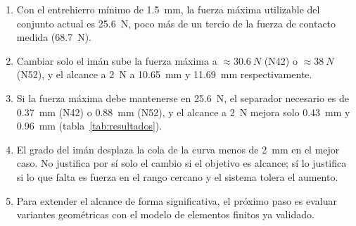 \documentclass[11pt,a4paper]{article}
\begin{document}
\begin{enumerate}
  \item Con el entrehierro mínimo de \SI{1,5}{mm}, la fuerza máxima utilizable del conjunto
  actual es \SI{25,6}{N}, poco más de un tercio de la fuerza de contacto medida
  (\SI{68,7}{N}).
  \item Cambiar solo el imán sube la fuerza máxima a $\approx\SI{30,6}{N}$ (N42) o
  $\approx\SI{38}{N}$ (N52), y el alcance a \SI{2}{N} a \SI{10,65}{mm} y \SI{11,69}{mm}
  respectivamente.
  \item Si la fuerza máxima debe mantenerse en \SI{25,6}{N}, el separador necesario es de
  \SI{0,37}{mm} (N42) o \SI{0,88}{mm} (N52), y el alcance a \SI{2}{N} mejora solo
  \SI{0,43}{mm} y \SI{0,96}{mm} (tabla~\ref{tab:resultados}).
  \item El grado del imán desplaza la cola de la curva menos de \SI{2}{mm} en el mejor caso.
  No justifica por sí solo el cambio si el objetivo es alcance; sí lo justifica si lo que
  falta es fuerza en el rango cercano y el sistema tolera el aumento.
  \item Para extender el alcance de forma significativa, el próximo paso es evaluar variantes
  geométricas con el modelo de elementos finitos ya validado.
\end{enumerate}
\end{document}
